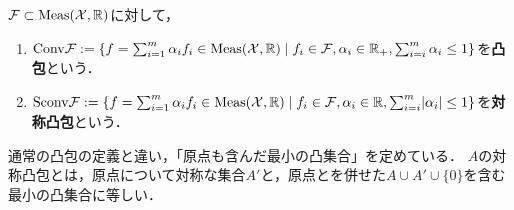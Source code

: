 \documentclass[uplatex,dvipdfmx]{jsreport}
\begin{document}
\begin{definition}
    $\mathcal{F}\subset\mathrm{Meas}(\mathcal{X},\mathbb{R})$に対して，
    \begin{enumerate}
        \item $\mathrm{Conv}\mathcal{F}:=\left\{f=\sum^m_{i=1}\alpha_if_i\in\mathrm{Meas}(\mathcal{X},\mathbb{R})\;\middle|\; f_i\in\mathcal{F},\alpha_i\in\mathbb{R}_+,\sum_{i=i}^m\alpha_i\le 1\right\}$を\textbf{凸包}という．
        \item $\mathrm{Sconv}\mathcal{F}:=\left\{f=\sum^m_{i=1}\alpha_if_i\in\mathrm{Meas}(\mathcal{X},\mathbb{R})\;\middle|\; f_i\in\mathcal{F},\alpha_i\in\mathbb{R},\sum_{i=i}^m\lvert\alpha_i\rvert\le 1\right\}$を\textbf{対称凸包}という．
    \end{enumerate}
\end{definition}
\begin{remark}
    通常の凸包の定義と違い，「原点も含んだ最小の凸集合」を定めている．
    $A$の対称凸包とは，原点について対称な集合$A'$と，原点とを併せた$A\cup A'\cup\{0\}$を含む最小の凸集合に等しい．
\end{remark}
\end{document}
